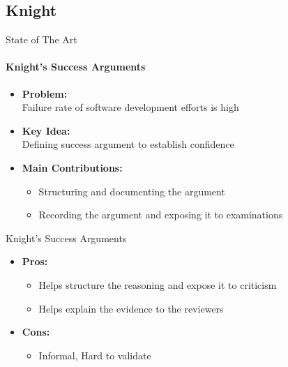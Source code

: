 \documentclass[xcolor=x11names,compress]{beamer}
\renewcommand{\(}{\begin{columns}}
\renewcommand{\)}{\end{columns}}
\newcommand{\<}[1]{\begin{column}{#1}}
\renewcommand{\>}{\end{column}}
\begin{document}
\subsection{Knight}
\begin{frame}{State of The Art}
\framesubtitle{Knight's Success Arguments \cite{Graydon:successarguments}}
\begin{itemize}
\item \textbf{Problem:}\\Failure rate of software development efforts is high
\item \textbf{Key Idea:} \\Defining success argument to establish confidence
\item \textbf{Main Contributions:}
\begin{itemize}
	\item Structuring and documenting the argument
	\item Recording the argument and exposing it to examinations

\end{itemize}
\end{itemize}

\end{frame}


\begin{frame}{Knight's Success Arguments}
\begin{itemize}
\item \textbf{Pros:} \\
	\begin{itemize}
	\item Helps structure the reasoning and expose it to criticism
	\item Helps explain the evidence to the reviewers
    \end{itemize}
\item \textbf{Cons:} \\
    \begin{itemize}
	\item Informal, Hard to validate
    \end{itemize}
\end{itemize}
\end{frame}


\end{document}
